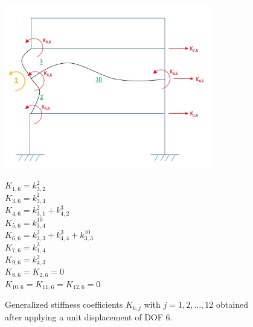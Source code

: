 \documentclass[11pt,a4paper,titlepage]{report}
\begin{document}
\begin{figure} [h]
\begin{minipage}{0.59\linewidth}
        \centering
         \includegraphics[width=9cm]{U=6.jpeg}
\end{minipage}
\begin{minipage}{0.4\linewidth}
\begin{small}
        $K_{1,6} = k^2_{3,2}$\\
        $K_{3,6} = k^2_{3,4}$\\
        $K_{4,6} = k^2_{3,1}+k^3_{4,2}$\\
        $K_{5,6} = k^{10}_{3,4}$\\
        $K_{6,6} = k^2_{3,3}+k^3_{4,4}+k^{10}_{3,3}$\\
        $K_{7,6} = k^3_{1,4}$\\
        $K_{9,6} = k^3_{4,3}$\\
        $K_{8,6} = K_{2,6} = 0$\\
        $K_{10,6} = K_{11,6} = K_{12,6} = 0$\\
\end{small}
\end{minipage}
\caption{Generalized stiffness coefficients $K_{6,j}$ with $j=1,2,...,12$ obtained after applying a unit displacement of DOF 6.}
\label{fig: I.1 - u6=1}
\end{figure}
\newpage
\end{document}
